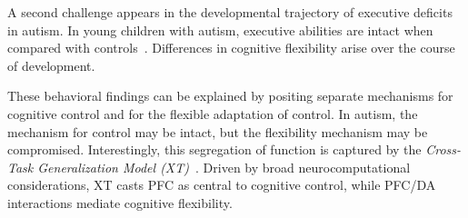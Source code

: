 A second challenge appears in the developmental trajectory of executive deficits in autism. In young children with autism, executive abilities are intact when compared with controls~\cite{GriffithEM:1999:AutismYoungED}. Differences in cognitive flexibility arise over the course of development.

These behavioral findings can be explained by positing separate mechanisms for cognitive control and for the flexible adaptation of control. In autism, the mechanism for control may be intact, but the flexibility mechanism may be compromised. Interestingly, this segregation of function is captured by the \emph{Cross-Task Generalization Model (XT)}~\cite{RougierNP:2005:XT}. Driven by broad neurocomputational considerations, XT casts PFC as central to cognitive control, while PFC/DA interactions mediate cognitive flexibility.


 
